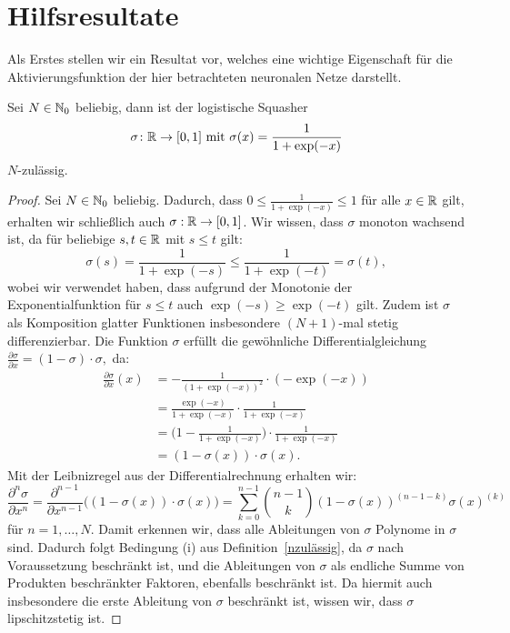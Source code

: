 \section{Hilfsresultate}
Als Erstes stellen wir ein Resultat vor, welches eine wichtige Eigenschaft für die Aktivierungsfunktion der hier betrachteten neuronalen Netze darstellt.
\begin{lem}
\label{lem:logsquasher}
Sei $N \in \mathbb{N}_0$ beliebig, dann ist der logistische Squasher $$\sigma\colon \mathbb{R} \to [0, 1] \text{ mit } \sigma(x) = \frac{1}{1 + \exp(-x)}$$ $N$-zulässig.
\end{lem}
\begin{proof}
Sei $N \in \mathbb{N}_0$ beliebig. Dadurch, dass $0 \leq \frac{1}{1 + \exp(-x)} \leq 1$ für alle $x \in \mathbb{R}$ gilt, erhalten wir schließlich auch $\sigma: \mathbb{R} \to [0,1]$. Wir wissen, dass $\sigma$ monoton wachsend ist, da für beliebige $s, t \in \mathbb{R}$ mit $s \leq t$ gilt:
$$\sigma(s) = \frac{1}{1 + \exp(-s)} \leq \frac{1}{1 + \exp(-t)} = \sigma(t),$$
wobei wir verwendet haben, dass aufgrund der Monotonie der Exponentialfunktion für $s \leq t$ auch $\exp(-s) \geq \exp(-t)$ gilt.
Zudem ist $\sigma$ als Komposition glatter Funktionen insbesondere $(N + 1)$-mal stetig differenzierbar. Die Funktion $\sigma$ erfüllt die gewöhnliche Differentialgleichung $\frac{\partial\sigma}{\partial x} = (1 - \sigma) \cdot \sigma,$ da:
\begin{equation*}
\begin{split}
\frac{\partial \sigma}{\partial x}(x) &= -\frac{1}{(1 + \exp(-x))^2} \cdot (-\exp(-x)) \\
& = \frac{\exp(-x)}{1 + \exp(-x)} \cdot \frac{1}{1 + \exp(-x)} \\
& = \bigg(1 - \frac{1}{1 + \exp(-x)}\bigg) \cdot \frac{1}{1 + \exp(-x)} \\
& = (1 - \sigma(x)) \cdot \sigma(x).
\end{split}
\end{equation*}
Mit der Leibnizregel aus der Differentialrechnung erhalten wir:
\begin{equation}
\label{eq:leibniz}
\frac{\partial^n\sigma}{\partial x^n} = \frac{\partial^{n - 1}}{\partial x^{n - 1}}\bigg((1 - \sigma(x)) \cdot \sigma(x)\bigg) = \sum_{k = 0}^{n-1}\binom{n - 1}{k}(1 - \sigma(x))^{(n - 1 - k)}  \sigma(x)^{(k)} 
\end{equation}
für $n = 1,\dots,N$. 
Damit erkennen wir, dass alle Ableitungen von $\sigma$ Polynome in $\sigma$ sind. Dadurch folgt Bedingung (i) aus Definition~\ref{nzulässig}, da $\sigma$ nach Voraussetzung beschränkt ist, und die Ableitungen von $\sigma$ als endliche Summe von Produkten beschränkter Faktoren, ebenfalls beschränkt ist. Da hiermit auch insbesondere die erste Ableitung von $\sigma$ beschränkt ist, wissen wir, dass $\sigma$ lipschitzstetig ist.


\end{proof}
